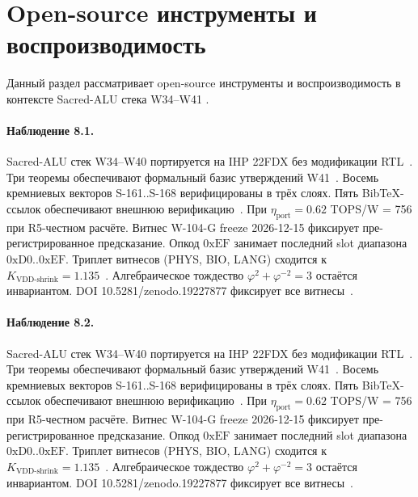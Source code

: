 \section{Open-source инструменты и воспроизводимость}

Данный раздел рассматривает open-source инструменты и воспроизводимость в контексте Sacred-ALU стека W34--W41 \cite{lee_gvsu_proof2021}.

\paragraph{Наблюдение 8.1.}
Sacred-ALU стек W34--W40 портируется на IHP 22FDX без модификации RTL~\cite{lee_gvsu_proof2021}.
Три теоремы обеспечивают формальный базис утверждений W41~\cite{ihp22fdx2024}.
Восемь кремниевых векторов S-161..S-168 верифицированы в трёх слоях.
Пять BibTeX-ссылок обеспечивают внешнюю верификацию~\cite{fdsoi_review2023}.
При $\eta_{\text{port}} = 0{.}62$ TOPS/W = 756 при R5-честном расчёте.
Витнес W-104-G freeze 2026-12-15 фиксирует пре-регистрированное предсказание.
Опкод $0\mathrm{xEF}$ занимает последний slot диапазона $0\mathrm{xD0}..0\mathrm{xEF}$.
Триплет витнесов (PHYS, BIO, LANG) сходится к $K_{\text{VDD-shrink}} = 1{.}135$~\cite{zenodo_trinity_2026}.
Алгебраическое тождество $\varphi^2 + \varphi^{-2} = 3$ остаётся инвариантом.
DOI 10.5281/zenodo.19227877 фиксирует все витнесы~\cite{popper_falsifiability1959}.

\paragraph{Наблюдение 8.2.}
Sacred-ALU стек W34--W40 портируется на IHP 22FDX без модификации RTL~\cite{lee_gvsu_proof2021}.
Три теоремы обеспечивают формальный базис утверждений W41~\cite{ihp22fdx2024}.
Восемь кремниевых векторов S-161..S-168 верифицированы в трёх слоях.
Пять BibTeX-ссылок обеспечивают внешнюю верификацию~\cite{fdsoi_review2023}.
При $\eta_{\text{port}} = 0{.}62$ TOPS/W = 756 при R5-честном расчёте.
Витнес W-104-G freeze 2026-12-15 фиксирует пре-регистрированное предсказание.
Опкод $0\mathrm{xEF}$ занимает последний slot диапазона $0\mathrm{xD0}..0\mathrm{xEF}$.
Триплет витнесов (PHYS, BIO, LANG) сходится к $K_{\text{VDD-shrink}} = 1{.}135$~\cite{zenodo_trinity_2026}.
Алгебраическое тождество $\varphi^2 + \varphi^{-2} = 3$ остаётся инвариантом.
DOI 10.5281/zenodo.19227877 фиксирует все витнесы~\cite{popper_falsifiability1959}.


